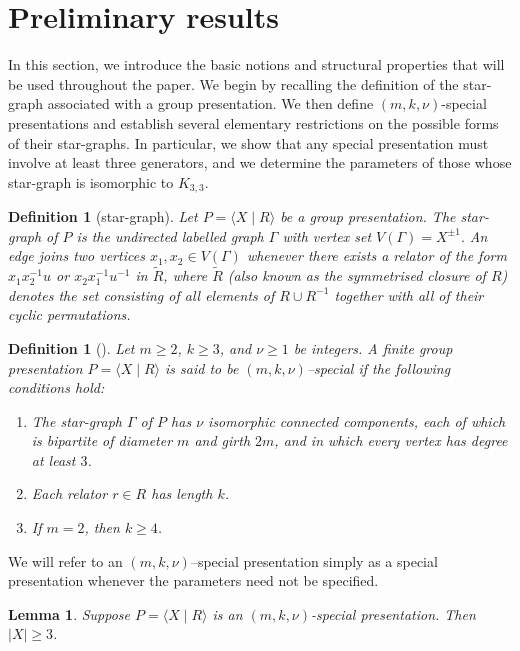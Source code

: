 \documentclass[a4paper,12pt,oneside]{article}
\newtheorem{lem}[theorem]{Lemma}
\newtheorem{defn}[theorem]{Definition}
\begin{document}
\section{Preliminary results}\label{sec:Preliminary}

In this section, we introduce the basic notions and structural properties that will be used throughout the paper. We begin by recalling the definition of the star-graph associated with a group presentation. We then define $(m,k,\nu)$-special presentations and establish several elementary restrictions on the possible forms of their star-graphs. In particular, we show that any special presentation must involve at least three generators, and we determine the parameters of those whose star-graph is isomorphic to $K_{3,3}$.

\begin{defn}[star-graph]\label{def:stargraph}
Let $P = \langle X \mid R \rangle$ be a group presentation. The \emph{star-graph} of $P$ is the undirected labelled graph $\Gamma$ with vertex set
\(
V(\Gamma) = X^{\pm 1}.
\)
An edge joins two vertices $x_1, x_2 \in V(\Gamma)$ whenever there exists a relator of the form
\(x_1 x_2^{-1} u\) or \(x_2 x_1^{-1} u^{-1}\) 
in  $\widetilde{R}$, where $\widetilde{R}$ (also known as the \emph{symmetrised closure} of $R$)  denotes the set consisting of all elements of $R \cup R^{-1}$ together with all of their cyclic permutations.
\end{defn}

\begin{defn}[{\cite[Definition~2.1]{CW21}}]\label{def:mknspecial}
Let $m \ge 2$, $k \ge 3$, and $\nu \ge 1$ be integers. A finite group presentation $P = \langle X \mid R \rangle$ is said to be \emph{$(m,k,\nu)$–special} if the following conditions hold:
\begin{enumerate}
    \item The star-graph $\Gamma$ of $P$ has $\nu$ isomorphic connected components, each of which is bipartite of diameter $m$ and girth $2m$, and in which every vertex has degree at least $3$.
    \item Each relator $r \in R$ has length $k$.
    \item If $m = 2$, then $k \ge 4$.
\end{enumerate}
\end{defn}
We will refer to an $(m,k,\nu)$--special presentation simply as a special presentation whenever the parameters need not be specified.
\begin{lem}\label{lem:threegens}
Suppose $P = \langle X \mid R \rangle$ is an $(m,k,\nu)$-special presentation. Then $|X| \ge 3$.
\end{lem}
\end{document}
